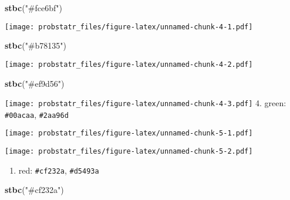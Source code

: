 \documentclass[]{ctexbook}
\newenvironment{Shaded}{\begin{snugshade}}{\end{snugshade}}
\newcommand{\KeywordTok}[1]{\textcolor[rgb]{0.13,0.29,0.53}{\textbf{#1}}}
\newcommand{\NormalTok}[1]{#1}
\newcommand{\StringTok}[1]{\textcolor[rgb]{0.31,0.60,0.02}{#1}}
\providecommand{\tightlist}{%
  \setlength{\itemsep}{0pt}\setlength{\parskip}{0pt}}
\begin{document}
\begin{Shaded}
\begin{Highlighting}[]
\KeywordTok{stbc}\NormalTok{(}\StringTok{"#fce6bf"}\NormalTok{)}
\end{Highlighting}
\end{Shaded}

\texttt{[image: probstatr\_files/figure-latex/unnamed-chunk-4-1.pdf]}

\begin{Shaded}
\begin{Highlighting}[]
\KeywordTok{stbc}\NormalTok{(}\StringTok{"#b78135"}\NormalTok{)}
\end{Highlighting}
\end{Shaded}

\texttt{[image: probstatr\_files/figure-latex/unnamed-chunk-4-2.pdf]}

\begin{Shaded}
\begin{Highlighting}[]
\KeywordTok{stbc}\NormalTok{(}\StringTok{"#ef9d56"}\NormalTok{)}
\end{Highlighting}
\end{Shaded}

\texttt{[image: probstatr\_files/figure-latex/unnamed-chunk-4-3.pdf]} 4.
green: \texttt{\#00acaa}, \texttt{\#2aa96d}

\begin{Shaded}
\end{Shaded}

\texttt{[image: probstatr\_files/figure-latex/unnamed-chunk-5-1.pdf]}

\begin{Shaded}
\end{Shaded}

\texttt{[image: probstatr\_files/figure-latex/unnamed-chunk-5-2.pdf]}

\begin{enumerate}
\def\labelenumi{\arabic{enumi}.}
\setcounter{enumi}{4}
\tightlist
\item
  red: \texttt{\#cf232a}, \texttt{\#d5493a}
\end{enumerate}

\begin{Shaded}
\begin{Highlighting}[]
\KeywordTok{stbc}\NormalTok{(}\StringTok{"#cf232a"}\NormalTok{)}
\end{Highlighting}
\end{Shaded}
\end{document}
